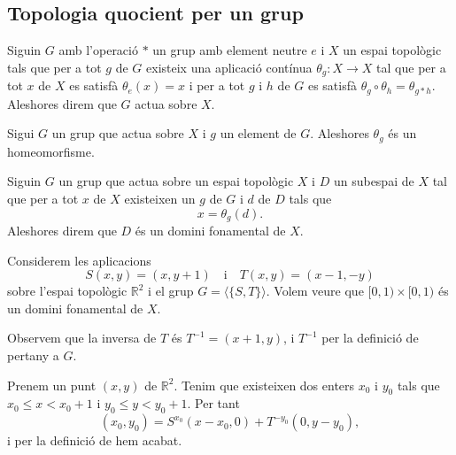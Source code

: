 \documentclass[../Apunts.tex]{subfiles}
\begin{document}
	\subsection{Topologia quocient per un grup}
	\begin{definition}
		\label{def:acció d'un grup sobre un espai topològic}
		Siguin \(G\) amb l'operació \(\ast\) un grup amb element neutre \(e\) i \(X\) un espai topològic tals que per a tot \(g\) de \(G\) existeix una aplicació contínua \(\theta_{g}\colon X\longrightarrow X\) tal que per a tot \(x\) de \(X\) es satisfà \(\theta_{e}(x)=x\) i per a tot \(g\) i \(h\) de \(G\) es satisfà \(\theta_{g}\circ\theta_{h}=\theta_{g\ast h}\). Aleshores direm que \(G\) actua sobre \(X\).
	\end{definition}
	\begin{observation}
		\label{obs:els accions de grup en un espai topològic són homeomorfismes}
		Sigui \(G\) un grup que actua sobre \(X\) i \(g\) un element de \(G\). Aleshores \(\theta_{g}\) és un homeomorfisme.
	\end{observation} %
	\begin{definition}
		\label{def:domini fonamental}
		Siguin \(G\) un grup que actua sobre un espai topològic \(X\) i \(D\) un subespai de \(X\) tal que per a tot \(x\) de \(X\) existeixen un \(g\) de \(G\) i \(d\) de \(D\) tals que
		\[x=\theta_{g}(d).\]
		Aleshores direm que \(D\) és un domini fonamental de \(X\).
	\end{definition}
	\begin{example}
		\label{ex:domini fonamental}
		Considerem les aplicacions
		\[S(x,y)=(x,y+1)\quad\text{i}\quad T(x,y)=(x-1,-y)\]
		sobre l'espai topològic \(\mathbb{R}^{2}\) i el grup \(G=\langle\{S,T\}\rangle\).
		Volem veure que \([0,1)\times[0,1)\) és un domini fonamental de \(X\).
		\begin{solution} %
			Observem que la inversa de \(T\) és \(T^{-1}=(x+1,y)\), i \(T^{-1}\) per la definició de pertany a \(G\).
			
			Prenem un punt \((x,y)\) de \(\mathbb{R}^{2}\). Tenim que existeixen dos enters \(x_{0}\) i \(y_{0}\) tals que \(x_{0}\leq x<x_{0}+1\) i \(y_{0}\leq y<y_{0}+1\). Per tant
			\[(x_{0},y_{0})=S^{x_{0}}(x-x_{0},0)+T^{-y_{0}}(0,y-y_{0}),\]
			i per la definició de  hem acabat.
		\end{solution} %
	\end{example}
\end{document}
